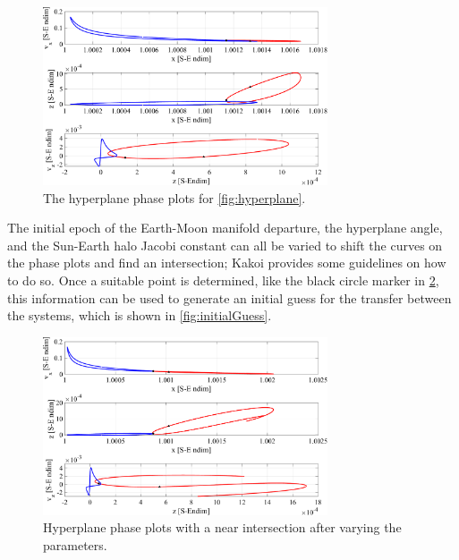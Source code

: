 \begin{figure}[ht]
    \centering
    \includegraphics[width=0.75\textwidth]{figures/PhasePlots.pdf}
    \caption{The hyperplane phase plots for \cref{fig:hyperplane}.}
    \label{fig:phasePlots}
\end{figure}

The initial epoch of the Earth-Moon manifold departure, the hyperplane angle, and the Sun-Earth
halo Jacobi constant can all be varied to shift the curves on the phase plots and find an
intersection; Kakoi provides some guidelines on how to do so\cite{Kakoi:2015}. Once a suitable
point is determined, like the black circle marker in \cref{fig:phasePlotsIntersect}, this
information can be used to generate an initial guess for the transfer between the systems, which is
shown in \cref{fig:initialGuess}.

\begin{figure}[ht]
    \centering
    \includegraphics[width=0.75\textwidth]{figures/PhasePlotsIntersect.pdf}
    \caption{Hyperplane phase plots with a near intersection after varying the parameters.}
    \label{fig:phasePlotsIntersect}
\end{figure}

